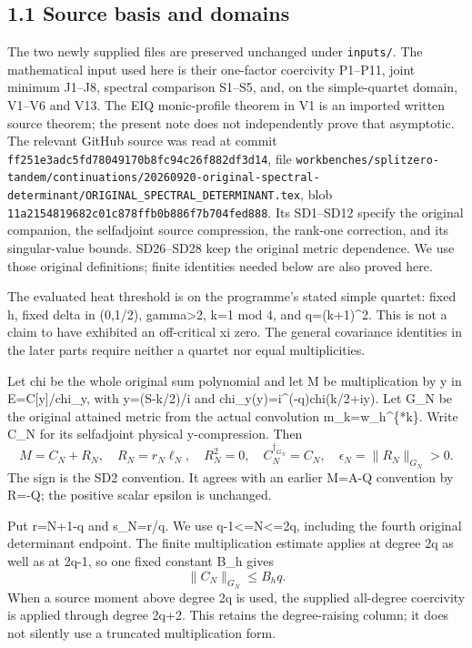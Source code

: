 \subsection{1.1 Source basis and domains}\label{source-basis-and-domains}

The two newly supplied files are preserved unchanged under \texttt{inputs/}. The mathematical input used here is their one-factor coercivity P1--P11, joint minimum J1--J8, spectral comparison S1--S5, and, on the simple-quartet domain, V1--V6 and V13. The EIQ monic-profile theorem in V1 is an imported written source theorem; the present note does not independently prove that asymptotic. The relevant GitHub source was read at commit \nolinkurl{ff251e3adc5fd78049170b8fc94c26f882df3d14}, file \nolinkurl{workbenches/splitzero-tandem/continuations/20260920-original-spectral-determinant/ORIGINAL_SPECTRAL_DETERMINANT.tex}, blob \nolinkurl{11a2154819682c01c878ffb0b886f7b704fed888}. Its SD1--SD12 specify the original companion, the selfadjoint source compression, the rank-one correction, and its singular-value bounds. SD26--SD28 keep the original metric dependence. We use those original definitions; finite identities needed below are also proved here.

The evaluated heat threshold is on the programme's stated simple quartet: fixed h, fixed delta in (0,1/2), gamma\textgreater2, k=1 mod 4, and q=(k+1)\^{}2. This is not a claim to have exhibited an off-critical xi zero. The general covariance identities in the later parts require neither a quartet nor equal multiplicities.

Let chi be the whole original sum polynomial and let M be multiplication by y in E=C{[}y{]}/chi\_y, with y=(S-k/2)/i and chi\_y(y)=i\^{}(-q)chi(k/2+iy). Let G\_N be the original attained metric from the actual convolution m\_k=w\_h\^{}\{*k\}. Write C\_N for its selfadjoint physical y-compression. Then \[
 M=C_N+R_N,\quad R_N=r_N\ell_N,\quad R_N^2=0,\quad
 C_N^{\dagger_{G_N}}=C_N,\quad \epsilon_N=\|R_N\|_{G_N}>0.
 \tag{H1}
\] The sign is the SD2 convention. It agrees with an earlier M=A-Q convention by R=-Q; the positive scalar epsilon is unchanged.

Put r=N+1-q and s\_N=r/q. We use q-1\textless=N\textless=2q, including the fourth original determinant endpoint. The finite multiplication estimate applies at degree 2q as well as at 2q-1, so one fixed constant B\_h gives \[
 \|C_N\|_{G_N}\le B_hq.
 \tag{H2}
\] When a source moment above degree 2q is used, the supplied all-degree coercivity is applied through degree 2q+2. This retains the degree-raising column; it does not silently use a truncated multiplication form.

